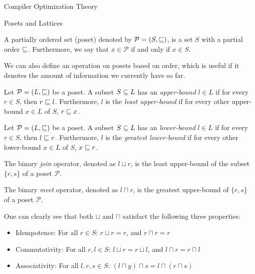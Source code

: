 \begin{section}{Compiler Optimization Theory}
\begin{subsection}{Posets and Lattices}
\begin{definition}
\begin{itemize}
A partially ordered set (poset) denoted by $\mathcal{P} = (S, \sqsubseteq)$, is a
set $S$ with a partial order $\sqsubseteq$. Furthermore, we say that $x \in \mathcal{P}$
if and only if $x \in S$.
\end{itemize}
\end{definition}

We can also define an operation on posets based on order, which is useful if
it denotes the amount of information we currently have so far.

\begin{definition}
Let $\mathcal{P} = (L, \sqsubseteq)$ be a poset. A subset $S \subseteq L$ has an
\textit{upper-bound} $l \in L$ if for every $r \in S$, then $r \sqsubseteq l$.
Furthermore, $l$ is the \textit{least upper-bound} if for every other
upper-bound $x \in L$ of $S$, $r \sqsubseteq x$.
\end{definition}

\begin{definition}
Let $\mathcal{P} = (L, \sqsubseteq)$ be a poset. A subset $S \subseteq L$ has an
\textit{lower-bound} $l \in L$ if for every $r \in S$, then $l \sqsubseteq r$.
Furthermore, $l$ is the \textit{greatest lower-bound} if for every other
lower-bound $x \in L$ of $S$, $x \sqsubseteq r$.
\end{definition}

\begin{definition}
The binary \textit{join} operator, denoted as $l \sqcup r$, is the
least upper-bound of the subset $\{r, s\}$ of a poset $\mathcal{P}$.
\end{definition}

\begin{definition}
The binary \textit{meet} operator, denoted as $l \sqcap r$, is the
greatest upper-bound of $\{r, s\}$ of a poset $\mathcal{P}$.
\end{definition}

One can clearly see that both $\sqcup$ and $\sqcap$ satisfact the
following three properties:

\begin{itemize}
	\item Idempotence: For all $r \in S$: $r \sqcup r = r$, and $r \sqcap r = r$ 
	\item Commutativity: For all $r, l \in S$: $l \sqcup r = r \sqcup l$, and
	$l \sqcap r = r \sqcap l$
	\item Associativity: For all $l, r, s \in S$: $(l \sqcap y) \sqcap s = l \sqcap (r \sqcap s)$
\end{itemize}


\end{subsection}
\end{section}
